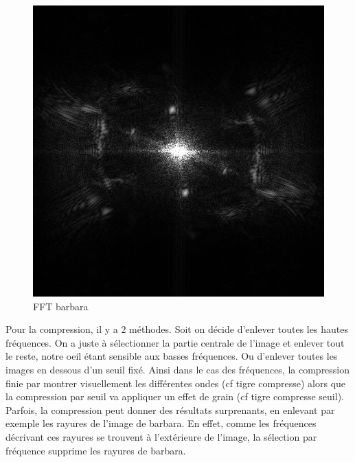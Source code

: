 \documentclass{article}
\begin{document}
\begin{figure}
	\begin{center}
		\includegraphics[scale=0.4]{barbara_FFT}\\
		FFT barbara
	\end{center}
\end{figure}
Pour la compression, il y a 2 méthodes. Soit on décide d'enlever toutes les hautes fréquences. On a juste à sélectionner la partie centrale de l'image et enlever tout le reste, notre oeil étant sensible aux basses fréquences. Ou d'enlever toutes les images en dessous d'un seuil fixé. Ainsi dans le cas des fréquences, la compression finie par montrer visuellement les différentes ondes (cf tigre compresse) alors que la compression par seuil va appliquer un effet de grain (cf tigre compresse seuil). Parfois, la compression peut donner des résultats surprenants, en enlevant par exemple les rayures de l'image de barbara. En effet, comme les fréquences décrivant ces rayures se trouvent à l'extérieure de l'image, la sélection par fréquence supprime les rayures de barbara.
\end{document}
